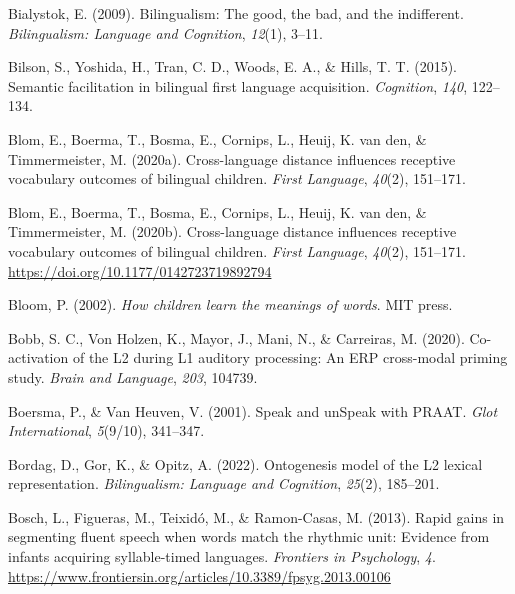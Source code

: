 \documentclass[
  12pt,
  b5paperpaper,
  twoside]{scrreprt}
\newlength{\cslhangindent}
\newlength{\cslentryspacingunit} %
\newenvironment{CSLReferences}[2] %
 {%
  \setlength{\parindent}{0pt}
  \ifodd #1
  \let\oldpar\par
  \def\par{\hangindent=\cslhangindent\oldpar}
  \fi
  \setlength{\parskip}{#2\cslentryspacingunit}
 }%
 {}
\begin{document}
\begin{CSLReferences}{1}{0}
\leavevmode{}%
Bialystok, E. (2009). Bilingualism: The good, the bad, and the
indifferent. \emph{Bilingualism: Language and Cognition}, \emph{12}(1),
3--11.

\leavevmode{}%
Bilson, S., Yoshida, H., Tran, C. D., Woods, E. A., \& Hills, T. T.
(2015). Semantic facilitation in bilingual first language acquisition.
\emph{Cognition}, \emph{140}, 122--134.

\leavevmode{}%
Blom, E., Boerma, T., Bosma, E., Cornips, L., Heuij, K. van den, \&
Timmermeister, M. (2020a). Cross-language distance influences receptive
vocabulary outcomes of bilingual children. \emph{First Language},
\emph{40}(2), 151--171.

\leavevmode{}%
Blom, E., Boerma, T., Bosma, E., Cornips, L., Heuij, K. van den, \&
Timmermeister, M. (2020b). Cross-language distance influences receptive
vocabulary outcomes of bilingual children. \emph{First Language},
\emph{40}(2), 151--171. \url{https://doi.org/10.1177/0142723719892794}

\leavevmode{}%
Bloom, P. (2002). \emph{How children learn the meanings of words}. MIT
press.

\leavevmode{}%
Bobb, S. C., Von Holzen, K., Mayor, J., Mani, N., \& Carreiras, M.
(2020). Co-activation of the L2 during L1 auditory processing: An ERP
cross-modal priming study. \emph{Brain and Language}, \emph{203},
104739.

\leavevmode{}%
Boersma, P., \& Van Heuven, V. (2001). Speak and unSpeak with PRAAT.
\emph{Glot International}, \emph{5}(9/10), 341--347.

\leavevmode{}%
Bordag, D., Gor, K., \& Opitz, A. (2022). Ontogenesis model of the L2
lexical representation. \emph{Bilingualism: Language and Cognition},
\emph{25}(2), 185--201.

\leavevmode{}%
Bosch, L., Figueras, M., Teixidó, M., \& Ramon-Casas, M. (2013). Rapid
gains in segmenting fluent speech when words match the rhythmic unit:
Evidence from infants acquiring syllable-timed languages.
\emph{Frontiers in Psychology}, \emph{4}.
\url{https://www.frontiersin.org/articles/10.3389/fpsyg.2013.00106}


\end{CSLReferences}
\end{document}
